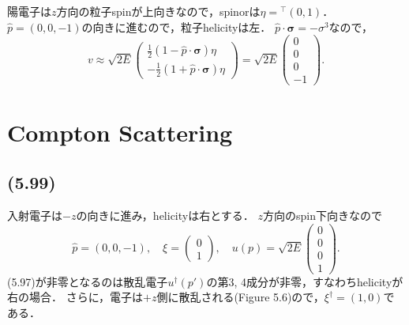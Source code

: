 陽電子は$z$方向の粒子spinが上向きなので，spinorは$\eta = {}^\top(0, 1)$．
$\hat{p} = (0, 0, -1)$の向きに進むので，粒子helicityは左．
$\hat{p}\cdot\boldsymbol\sigma = - \sigma^3$なので，
\[
v \approx \sqrt{2E}
\begin{pmatrix}
  \frac{1}{2} (1 - \hat{p} \cdot \boldsymbol\sigma) \eta \\[5pt]
  - \frac{1}{2} (1 + \hat{p} \cdot \boldsymbol\sigma) \eta
\end{pmatrix}
= \sqrt{2E}
\begin{pmatrix}
  0 \\
  0 \\
  0 \\
  -1
\end{pmatrix}
.
\]

\setcounter{section}{4}
\section{Compton Scattering}
\subsection{(5.99)}
入射電子は$-z$の向きに進み，helicityは右とする．
$z$方向のspin下向きなので
\[
\hat{p} = (0, 0, -1) ,\quad \xi =
\begin{pmatrix}
  0 \\
  1
\end{pmatrix}
,\quad
u(p) =
\sqrt{2E}
\begin{pmatrix}
  0 \\
  0 \\
  0 \\
  1
\end{pmatrix}
.
\]
(5.97)が非零となるのは散乱電子$u^\dagger(p')$の第3, 4成分が非零，すなわちhelicityが右の場合．
さらに，電子は$+z$側に散乱される(Figure 5.6)ので，$\xi^\dagger = (1, 0)$である．
